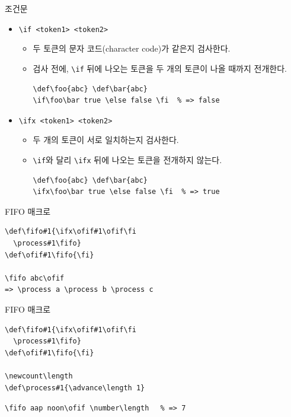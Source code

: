 \documentclass{beamer}
\begin{document}
%
\begin{frame}[fragile]{조건문}
  \begin{itemize}
  \item \verb+\if <token1> <token2>+
    \begin{itemize}
    \item 두 토큰의 문자 코드(character code)가 같은지 검사한다.
    \item 검사 전에, \verb+\if+ 뒤에 나오는 토큰을 두 개의 토큰이 나올 때까지 전개한다.
\begin{verbatim}
\def\foo{abc} \def\bar{abc}
\if\foo\bar true \else false \fi  % => false
\end{verbatim}
    \end{itemize}
  \item \verb+\ifx <token1> <token2>+
    \begin{itemize}
    \item 두 개의 토큰이 서로 일치하는지 검사한다.
    \item \verb+\if+와 달리 \verb+\ifx+ 뒤에 나오는 토큰을 전개하지 않는다.
\begin{verbatim}
\def\foo{abc} \def\bar{abc}
\ifx\foo\bar true \else false \fi  % => true
\end{verbatim}
    \end{itemize}
  \end{itemize}
\end{frame}


%
\begin{frame}[fragile]{FIFO 매크로}
\begin{verbatim}
\def\fifo#1{\ifx\ofif#1\ofif\fi
  \process#1\fifo}
\def\ofif#1\fifo{\fi}

\fifo abc\ofif
=> \process a \process b \process c
\end{verbatim}
\end{frame}


%
\begin{frame}[fragile]{FIFO 매크로}
\begin{verbatim}
\def\fifo#1{\ifx\ofif#1\ofif\fi
  \process#1\fifo}
\def\ofif#1\fifo{\fi}

\newcount\length
\def\process#1{\advance\length 1}
\end{verbatim}

\verb*+\fifo aap noon\ofif \number\length+ \verb+  % => 7+
\end{frame}


%
\def\fifo#1{\ifx\ofif#1\ofif\fi
  \process#1\fifo}
\def\ofif#1\fifo{\fi}
\def\process#1{\fbox{#1}\,}
\end{document}
